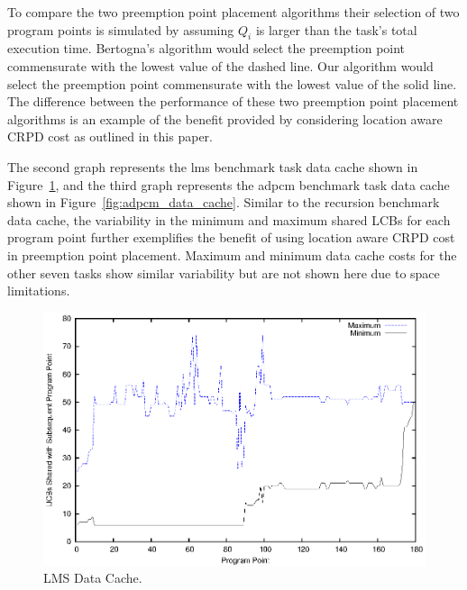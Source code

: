 To compare the two preemption point placement algorithms their selection of two program points is
simulated by assuming ${Q_i}$ is larger than the task's total execution time. Bertogna's algorithm would select the preemption point commensurate with the lowest value of the dashed line. Our algorithm would select the preemption point commensurate with the lowest value of the solid line.  The difference between the performance of these two preemption point placement algorithms is an example of the benefit provided by considering location aware CRPD cost as outlined in this paper.

The second graph represents the lms benchmark task data cache shown in Figure~\ref{fig:lms_data_cache}, and the third graph represents the adpcm benchmark task data cache shown in Figure~\ref{fig:adpcm_data_cache}. Similar to the recursion benchmark data cache, the variability in the minimum and maximum shared LCBs for each program point further exemplifies the benefit of using location aware CRPD cost in preemption point placement.  Maximum and minimum data cache costs for the other seven tasks show similar variability but are not shown here due to space limitations.
\begin{figure}[h!]
\vspace{-10pt}
\begin{center}
\includegraphics[width=\linewidth]{eps/lms-dcache.eps}
\caption{LMS Data Cache.}
\label{fig:lms_data_cache}
\end{center}
\vspace{-10pt}
\end{figure}
